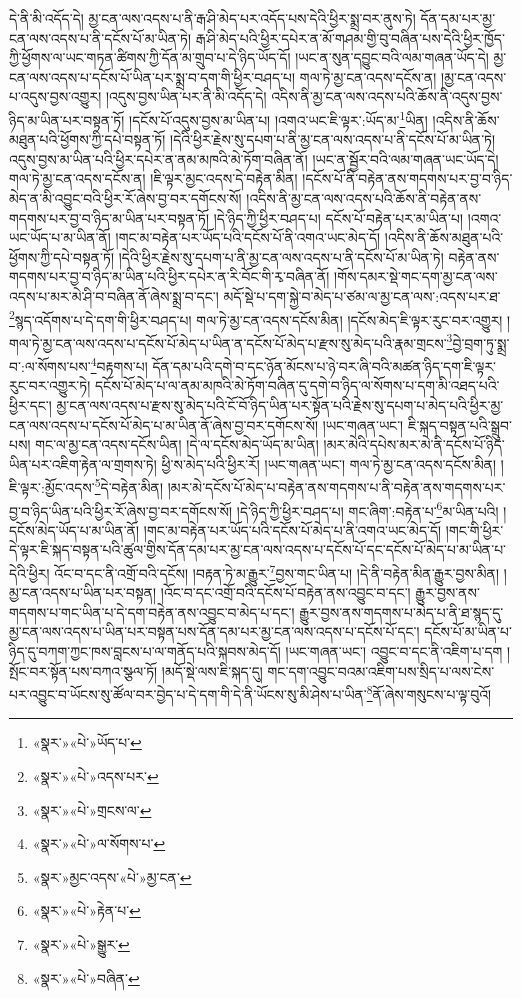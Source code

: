 དེ་ནི་མི་འདོད་དེ། མྱ་ངན་ལས་འདས་པ་ནི་རྒ་ཤི་མེད་པར་འདོད་པས་དེའི་ཕྱིར་སྨྲ་བར་ནུས་ཏེ། དོན་དམ་པར་མྱ་ངན་ལས་འདས་པ་ནི་དངོས་པོ་མ་ཡིན་ཏེ། རྒ་ཤི་མེད་པའི་ཕྱིར་དཔེར་ན་མོ་གཤམ་གྱི་བུ་བཞིན་པས་དེའི་ཕྱིར་ཁྱོད་ཀྱི་ཕྱོགས་ལ་ཡང་གཏན་ཚིགས་ཀྱི་དོན་མ་གྲུབ་པ་དེ་ཉིད་ཡོད་དོ། །ཡང་ན་སུན་དབྱུང་བའི་ལམ་གཞན་ཡོད་དེ། མྱ་ངན་ལས་འདས་པ་དངོས་པོ་ཡིན་པར་སྨྲ་བ་དག་གི་ཕྱིར་བཤད་པ། གལ་ཏེ་མྱ་ངན་འདས་དངོས་ན། །མྱ་ངན་འདས་པ་འདུས་བྱས་འགྱུར། །འདུས་བྱས་ཡིན་པར་ནི་མི་འདོད་དེ། འདིས་ནི་མྱ་ངན་ལས་འདས་པའི་ཆོས་ནི་འདུས་བྱས་ཉིད་མ་ཡིན་པར་བསྟན་ཏོ། །དངོས་པོ་འདུས་བྱས་མ་ཡིན་པ། །འགའ་ཡང་ཇི་ལྟར་:ཡོད་མ་\footnote{«སྣར་»«པེ་»ཡོད་པ་}ཡིན། །འདིས་ནི་ཆོས་མཐུན་པའི་ཕྱོགས་ཀྱི་དཔེ་བསྟན་ཏོ། །དེའི་ཕྱིར་རྗེས་སུ་དཔག་པ་ནི་མྱ་ངན་ལས་འདས་པ་ནི་དངོས་པོ་མ་ཡིན་ཏེ། འདུས་བྱས་མ་ཡིན་པའི་ཕྱིར་དཔེར་ན་ནམ་མཁའི་མེ་ཏོག་བཞིན་ནོ། །ཡང་ན་སྦྱོར་བའི་ལམ་གཞན་ཡང་ཡོད་དེ། གལ་ཏེ་མྱ་ངན་འདས་དངོས་ན། །ཇི་ལྟར་མྱང་འདས་དེ་བརྟེན་མིན། །དངོས་པོ་ནི་བརྟེན་ནས་གདགས་པར་བྱ་བ་ཉིད་མེད་ན་མི་འབྱུང་བའི་ཕྱིར་རོ་ཞེས་བྱ་བར་དགོངས་སོ། །འདིས་ནི་མྱ་ངན་ལས་འདས་པའི་ཆོས་ནི་བརྟེན་ནས་གདགས་པར་བྱ་བ་ཉིད་མ་ཡིན་པར་བསྟན་ཏོ། །དེ་ཉིད་ཀྱི་ཕྱིར་བཤད་པ། དངོས་པོ་བརྟེན་པར་མ་ཡིན་པ། །འགའ་ཡང་ཡོད་པ་མ་ཡིན་ནོ། །གང་མ་བརྟེན་པར་ཡོད་པའི་དངོས་པོ་ནི་འགའ་ཡང་མེད་དོ། །འདིས་ནི་ཆོས་མཐུན་པའི་ཕྱོགས་ཀྱི་དཔེ་བསྟན་ཏོ། །དེའི་ཕྱིར་རྗེས་སུ་དཔག་པ་ནི་མྱ་ངན་ལས་འདས་པ་ནི་དངོས་པོ་མ་ཡིན་ཏེ། བརྟེན་ནས་གདགས་པར་བྱ་བ་ཉིད་མ་ཡིན་པའི་ཕྱིར་དཔེར་ན་རི་བོང་གི་རྭ་བཞིན་ནོ། །གོས་དམར་སྡེ་གང་དག་མྱ་ངན་ལས་འདས་པ་མར་མེ་ཤི་བ་བཞིན་ནོ་ཞེས་སྨྲ་བ་དང་། མདོ་སྡེ་པ་དག་སྐྱེ་བ་མེད་པ་ཙམ་ལ་མྱ་ངན་ལས་:འདས་པར་ཐ་\footnote{«སྣར་»«པེ་»འདས་པར་}སྙད་འདོགས་པ་དེ་དག་གི་ཕྱིར་བཤད་པ། གལ་ཏེ་མྱ་ངན་འདས་དངོས་མིན། །དངོས་མེད་ཇི་ལྟར་རུང་བར་འགྱུར། །གལ་ཏེ་མྱ་ངན་ལས་འདས་པ་དངོས་པོ་མེད་པ་ཡིན་ན་དངོས་པོ་མེད་པ་རྫས་སུ་མེད་པའི་རྣམ་གྲངས་\footnote{«སྣར་»«པེ་»གྲངས་ལ་}བྱེ་བྲག་ཏུ་སྨྲ་བ་:ལ་སོགས་པས་\footnote{«སྣར་»«པེ་»ལ་སོགས་པ་}བརྟགས་པ། དོན་དམ་པའི་དགེ་བ་དང་ཉོན་མོངས་པ་ཉེ་བར་ཞི་བའི་མཚན་ཉིད་དག་ཇི་ལྟར་རུང་བར་འགྱུར་ཏེ། དངོས་པོ་མེད་པ་ལ་ནམ་མཁའི་མེ་ཏོག་བཞིན་དུ་དགེ་བ་ཉིད་ལ་སོགས་པ་དག་མི་འཐད་པའི་ཕྱིར་དང་། མྱ་ངན་ལས་འདས་པ་རྫས་སུ་མེད་པའི་ངོ་བོ་ཉིད་ཡིན་པར་སྟོན་པའི་རྗེས་སུ་དཔག་པ་མེད་པའི་ཕྱིར་མྱ་ངན་ལས་འདས་པ་དངོས་པོ་མེད་པ་མ་ཡིན་ནོ་ཞེས་བྱ་བར་དགོངས་སོ། །ཡང་གཞན་ཡང་། ཇི་སྐད་བསྟན་པའི་སྒྲུབ་པས། གང་ལ་མྱ་ངན་འདས་དངོས་ཡིན། །དེ་ལ་དངོས་མེད་ཡོད་མ་ཡིན། །མར་མེའི་དཔེས་མར་མེ་ནི་དངོས་པོ་ཉིད་ཡིན་པར་འཇིག་རྟེན་ལ་གྲགས་ཏེ། ཕྱི་ས་མེད་པའི་ཕྱིར་རོ། །ཡང་གཞན་ཡང་། གལ་ཏེ་མྱ་ངན་འདས་དངོས་མིན། །ཇི་ལྟར་:མྱོང་འདས་\footnote{«སྣར་»མྱང་འདས་«པེ་»མྱ་ངན་}དེ་བརྟེན་མིན། །མར་མེ་དངོས་པོ་མེད་པ་བརྟེན་ནས་གདགས་པ་ནི་བརྟེན་ནས་གདགས་པར་བྱ་བ་ཉིད་ཡིན་པའི་ཕྱིར་རོ་ཞེས་བྱ་བར་དགོངས་སོ། །དེ་ཉིད་ཀྱི་ཕྱིར་བཤད་པ། གང་ཞིག་:བརྟེན་པ་\footnote{«སྣར་»«པེ་»རྟེན་པ་}མ་ཡིན་པའི། །དངོས་མེད་ཡོད་པ་མ་ཡིན་ནོ། །གང་མ་བརྟེན་པར་ཡོད་པའི་དངོས་པོ་མེད་པ་ནི་འགའ་ཡང་མེད་དོ། །གང་གི་ཕྱིར་དེ་ལྟར་ཇི་སྐད་བསྟན་པའི་ཚུལ་གྱིས་དོན་དམ་པར་མྱ་ངན་ལས་འདས་པ་དངོས་པོ་དང་དངོས་པོ་མེད་པ་མ་ཡིན་པ་དེའི་ཕྱིར། འོང་བ་དང་ནི་འགྲོ་བའི་དངོས། །བརྟན་ཏེ་མ་རྒྱུར་\footnote{«སྣར་»«པེ་»སྒྱུར་}བྱས་གང་ཡིན་པ། །དེ་ནི་བརྟེན་མིན་རྒྱུར་བྱས་མིན། །མྱ་ངན་འདས་པ་ཡིན་པར་བསྟན། །འོང་བ་དང་འགྲོ་བའི་དངོས་པོ་བརྟེན་ནས་འབྱུང་བ་དང་། རྒྱུར་བྱས་ནས་གདགས་པ་གང་ཡིན་པ་དེ་དག་བརྟེན་ནས་འབྱུང་བ་མེད་པ་དང་། རྒྱུར་བྱས་ནས་གདགས་པ་མེད་པ་ནི་ཐ་སྙད་དུ་མྱ་ངན་ལས་འདས་པ་ཡིན་པར་བསྟན་པས་དོན་དམ་པར་མྱ་ངན་ལས་འདས་པ་དངོས་པོ་དང་། དངོས་པོ་མ་ཡིན་པ་ཉིད་དུ་བཀག་ཀྱང་ཁས་བླངས་པ་ལ་གནོད་པའི་སྐབས་མེད་དོ། །ཡང་གཞན་ཡང་། འབྱུང་བ་དང་ནི་འཇིག་པ་དག །སྤོང་བར་སྟོན་པས་བཀའ་སྩལ་ཏོ། །མདོ་སྡེ་ལས་ཇི་སྐད་དུ། གང་དག་འབྱུང་བའམ་འཇིག་པས་སྲིད་པ་ལས་ངེས་པར་འབྱུང་བ་ཡོངས་སུ་ཚོལ་བར་བྱེད་པ་དེ་དག་གི་དེ་ནི་ཡོངས་སུ་མི་ཤེས་པ་ཡིན་\footnote{«སྣར་»«པེ་»བཞིན་}ནོ་ཞེས་གསུངས་པ་ལྟ་བུའོ། 
